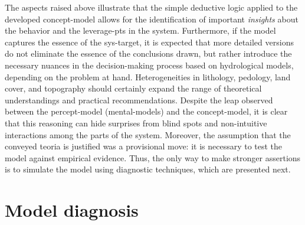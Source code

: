 \documentclass[./main_en.tex]{subfiles}
\begin{document}
\par The aspects raised above illustrate that the simple deductive logic applied to the developed \gls{concept-model} allows for the identification of important \textit{insights} about the behavior and the \gls{leverage-pts} in the \gls{system}. Furthermore, if the \gls{model} captures the essence of the \gls{sys-target}, it is expected that more detailed versions do not eliminate the essence of the conclusions drawn, but rather introduce the necessary nuances in the decision-making process based on hydrological models, depending on the problem at hand. Heterogeneities in lithology, pedology, land cover, and topography should certainly expand the range of theoretical understandings and practical recommendations. Despite the leap observed between the \gls{percept-model} (\gls{mental-models}) and the \gls{concept-model}, it is clear that this reasoning can hide surprises from blind spots and non-intuitive interactions among the parts of the \gls{system}. Moreover, the assumption that the conveyed \gls{teoria} is justified was a provisional move: it is necessary to test the \gls{model} against empirical evidence. Thus, the only way to make stronger assertions is to simulate the \gls{model} using diagnostic techniques, which are presented next.

\section{Model diagnosis} \label{sec:sys:diags}
\end{document}
